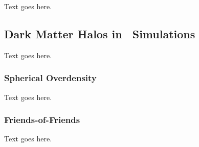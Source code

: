 Text goes here.




\subsection{Dark Matter Halos in \nbody\ Simulations}
\label{subsec:computational_theory--halos_in_nbody_simulations}


Text goes here.



\subsubsection{Spherical Overdensity}
\label{subsubsec:computational_theory--halos_in_nbody_simulations--spherical_overdensity}


Text goes here.



\subsubsection{Friends-of-Friends}
\label{subsubsec:computational_theory--halos_in_nbody_simulations--friends-of-friends}


Text goes here.




